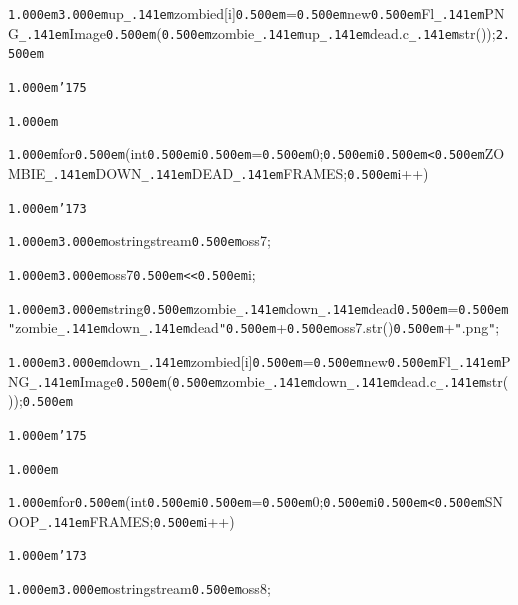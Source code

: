 \documentclass[12pt]{article}
\begin{document}
\noindent
{}{\tt\mc \kern1.000em}{\tt\mc \kern3.000em}up{\tt\_\kern.141em}zombied[i]{\tt\mc \kern0.500em}={\tt\mc \kern0.500em}new{\tt\mc \kern0.500em}Fl{\tt\_\kern.141em}PNG{\tt\_\kern.141em}Image{\tt\mc \kern0.500em}({\tt\mc \kern0.500em}zombie{\tt\_\kern.141em}up{\tt\_\kern.141em}dead.c{\tt\_\kern.141em}str());{\tt\mc \kern2.500em}

\noindent
{}{\tt\mc \kern1.000em}{\tt\char'175}

\noindent
{}{\tt\mc \kern1.000em}

\noindent
{}{\tt\mc \kern1.000em}for{\tt\mc \kern0.500em}(int{\tt\mc \kern0.500em}i{\tt\mc \kern0.500em}={\tt\mc \kern0.500em}0;{\tt\mc \kern0.500em}i{\tt\mc \kern0.500em}{\tt <}{\tt\mc \kern0.500em}ZOMBIE{\tt\_\kern.141em}DOWN{\tt\_\kern.141em}DEAD{\tt\_\kern.141em}FRAMES;{\tt\mc \kern0.500em}i++)

\noindent
{}{\tt\mc \kern1.000em}{\tt\char'173}

\noindent
{}{\tt\mc \kern1.000em}{\tt\mc \kern3.000em}ostringstream{\tt\mc \kern0.500em}oss7;

\noindent
{}{\tt\mc \kern1.000em}{\tt\mc \kern3.000em}oss7{\tt\mc \kern0.500em}{\tt <}{\tt <}{\tt\mc \kern0.500em}i;

\noindent
{}{\tt\mc \kern1.000em}{\tt\mc \kern3.000em}string{\tt\mc \kern0.500em}zombie{\tt\_\kern.141em}down{\tt\_\kern.141em}dead{\tt\mc \kern0.500em}={\tt\mc \kern0.500em}{\tt "}zombie{\tt\_\kern.141em}down{\tt\_\kern.141em}dead{\tt "}{\tt\mc \kern0.500em}+{\tt\mc \kern0.500em}oss7.str(){\tt\mc \kern0.500em}+{\tt "}.png{\tt "};

\noindent
{}{\tt\mc \kern1.000em}{\tt\mc \kern3.000em}down{\tt\_\kern.141em}zombied[i]{\tt\mc \kern0.500em}={\tt\mc \kern0.500em}new{\tt\mc \kern0.500em}Fl{\tt\_\kern.141em}PNG{\tt\_\kern.141em}Image{\tt\mc \kern0.500em}({\tt\mc \kern0.500em}zombie{\tt\_\kern.141em}down{\tt\_\kern.141em}dead.c{\tt\_\kern.141em}str());{\tt\mc \kern0.500em}

\noindent
{}{\tt\mc \kern1.000em}{\tt\char'175}

\noindent
{}{\tt\mc \kern1.000em}

\noindent
{}{\tt\mc \kern1.000em}for{\tt\mc \kern0.500em}(int{\tt\mc \kern0.500em}i{\tt\mc \kern0.500em}={\tt\mc \kern0.500em}0;{\tt\mc \kern0.500em}i{\tt\mc \kern0.500em}{\tt <}{\tt\mc \kern0.500em}SNOOP{\tt\_\kern.141em}FRAMES;{\tt\mc \kern0.500em}i++)

\noindent
{}{\tt\mc \kern1.000em}{\tt\char'173}

\noindent
{}{\tt\mc \kern1.000em}{\tt\mc \kern3.000em}ostringstream{\tt\mc \kern0.500em}oss8;
\end{document}
